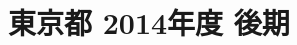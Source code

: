 \documentclass[../../hsm_tok_q.tex]{subfiles}
\begin{document}
    \section{東京都 2014年度 後期}
    \subsection{　}
    
    \newpage
    \subsection{　}
    
    \newpage
    \subsection{　}
    
    \newpage
    \subsection{　}
    
    \newpage
    \subsection{　}
    
\end{document}
